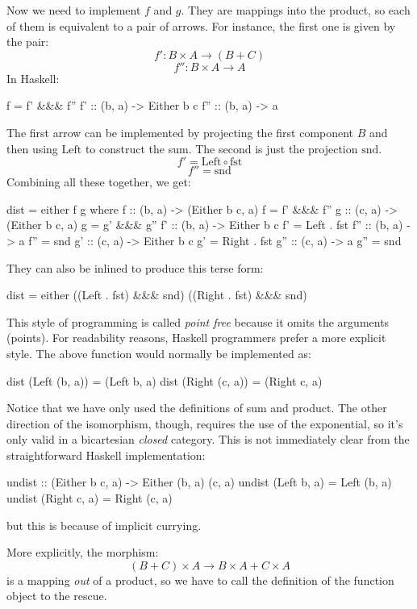 \documentclass[DaoFP]{subfiles}
\begin{document}
Now we need to implement $f$ and $g$. They are mappings into the product, so each of them is equivalent to a pair of arrows. For instance, the first one is given by the pair:
\[f' \colon B \times A \to (B + C)\]
\[f'' \colon B \times A \to  A\]
In Haskell:
\begin{haskell}
    f = f' &&& f''
    f'  :: (b, a) -> Either b c
    f'' :: (b, a) -> a
\end{haskell}
The first arrow can be implemented by projecting the first component $B$ and then using $\text{Left}$ to construct the sum. The second is just the projection $\text{snd}$.
\[ f' = \text{Left} \circ \text{fst} \]
\[ f'' = \text{snd} \]
Combining all these together, we get:
\begin{haskell}
dist = either f g
  where
    f   :: (b, a) -> (Either b c, a)
    f   = f' &&& f''
    g   :: (c, a) -> (Either b c, a)
    g   = g' &&& g''
    f'  :: (b, a) -> Either b c
    f'  = Left . fst
    f'' :: (b, a) -> a
    f'' = snd
    g'  :: (c, a) -> Either b c
    g'  = Right . fst
    g'' :: (c, a) -> a
    g'' = snd
\end{haskell}
They can also be inlined to produce this terse form:
\begin{haskell}
dist = either ((Left . fst) &&& snd) ((Right . fst) &&& snd)
\end{haskell}
This style of programming is called \emph{point free} because it omits the arguments (points). For readability reasons, Haskell programmers prefer a more explicit style. The above function would normally be implemented as:
\begin{haskell}
dist (Left  (b, a)) = (Left b, a)
dist (Right (c, a)) = (Right c, a)
\end{haskell}

Notice that we have only used the definitions of sum and product. The other direction of the isomorphism, though, requires the use of the exponential, so it's only valid in a bicartesian \emph{closed} category. This is not immediately clear from the straightforward Haskell implementation:
\begin{haskell}
undist :: (Either b c, a) -> Either (b, a) (c, a)
undist (Left b, a)  = Left (b, a)
undist (Right c, a) = Right (c, a)
\end{haskell}
but this is because of implicit currying. 

More explicitly, the morphism:
\[(B + C) \times A \to B \times A + C \times A\]
is a mapping \emph{out} of a product, so we have to call the definition of the function object to the rescue.  
\end{document}
